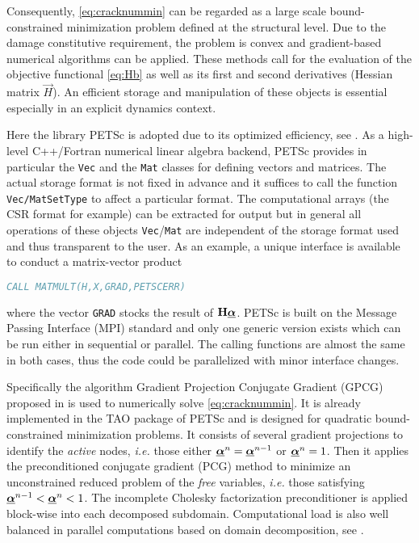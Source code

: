 Consequently, \eqref{eq:cracknummin} can be regarded as a large scale bound-constrained minimization problem defined at the structural level. Due to the damage constitutive requirement, the problem is convex and gradient-based numerical algorithms can be applied. These methods call for the evaluation of the objective functional \eqref{eq:Hb} as well as its first and second derivatives (Hessian matrix $\vec{H}$). An efficient storage and manipulation of these objects is essential especially in an explicit dynamics context.

Here the library PETSc is adopted due to its optimized efficiency, see \cite{PETSc:2015}. As a high-level C++/Fortran numerical linear algebra backend, PETSc provides in particular the \texttt{Vec} and the \texttt{Mat} classes for defining vectors and matrices. The actual storage format is not fixed in advance and it suffices to call the function \texttt{Vec/MatSetType} to affect a particular format. The computational arrays (the CSR format for example) can be extracted for output but in general all operations of these objects \texttt{Vec}/\texttt{Mat} are independent of the storage format used and thus transparent to the user. As an example, a unique interface is available to conduct a matrix-vector product
\begin{lstlisting}[language=Fortran]
CALL MATMULT(H,X,GRAD,PETSCERR)
\end{lstlisting}
where the vector \texttt{GRAD} stocks the result of $\vec{H}\dvec$. PETSc is built on the Message Passing Interface (MPI) standard and only one generic version exists which can be run either in sequential or parallel. The calling functions are almost the same in both cases, thus the code could be parallelized with minor interface changes.

Specifically the algorithm Gradient Projection Conjugate Gradient (GPCG) proposed in \cite{MoreToraldo:1991} is used to numerically solve \eqref{eq:cracknummin}. It is already implemented in the TAO package of PETSc and is designed for quadratic bound-constrained minimization problems. It consists of several gradient projections to identify the \emph{active} nodes, \emph{i.e.} those either $\dvec^n=\dvec^{n-1}$ or $\dvec^n=1$. Then it applies the preconditioned conjugate gradient (PCG) method to minimize an unconstrained reduced problem of the \emph{free} variables, \emph{i.e.} those satisfying $\dvec^{n-1}<\dvec^n<1$. The incomplete Cholesky factorization preconditioner is applied block-wise into each decomposed subdomain. Computational load is also well balanced in parallel computations based on domain decomposition, see \cite{BensonMcInnesMore:2001}.

